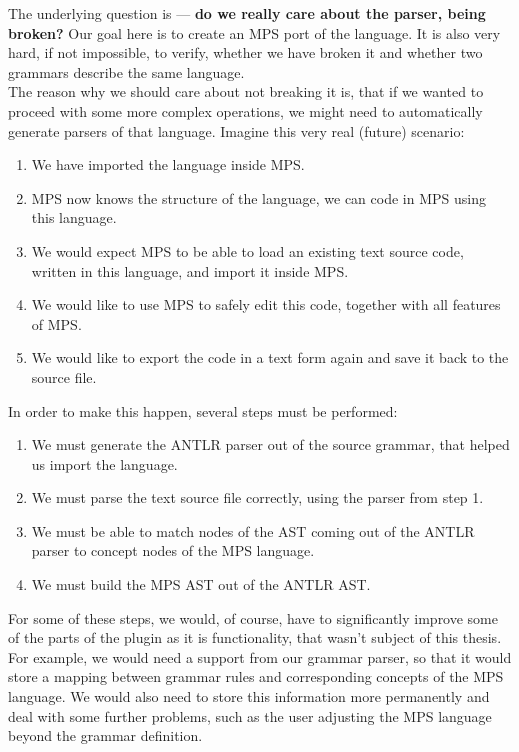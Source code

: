 The underlying question is --- \textbf{do we really care about the parser, being broken?}
Our goal here is to create an MPS port of the language.
It is also very hard, if not impossible, to verify, whether we have broken it and whether two grammars describe the same language.
\\

The reason why we should care about not breaking it is, that if we wanted to proceed with some more complex operations, we might need to automatically generate parsers of that language.
Imagine this very real (future) scenario:

\begin{enumerate}
	\item We have imported the language inside MPS.

	\item MPS now knows the structure of the language, we can code in MPS using this language.

	\item We would expect MPS to be able to load an existing text source code, written in this language, and import it inside MPS.

	\item We would like to use MPS to safely edit this code, together with all features of MPS.

	\item We would like to export the code in a text form again and save it back to the source file.
\end{enumerate}

\noindent
In order to make this happen, several steps must be performed:

\begin{enumerate}
	\item We must generate the ANTLR parser out of the source grammar, that helped us import the language.

	\item We must parse the text source file correctly, using the parser from step 1.

	\item We must be able to match nodes of the AST coming out of the ANTLR parser to concept nodes of the MPS language.

	\item We must build the MPS AST out of the ANTLR AST.
\end{enumerate}

For some of these steps, we would, of course, have to significantly improve some of the parts of the plugin as it is functionality, that wasn't subject of this thesis.
For example, we would need a support from our grammar parser, so that it would store a mapping between grammar rules and corresponding concepts of the MPS language.
We would also need to store this information more permanently and deal with some further problems, such as the user adjusting the MPS language beyond the grammar definition.
\\

